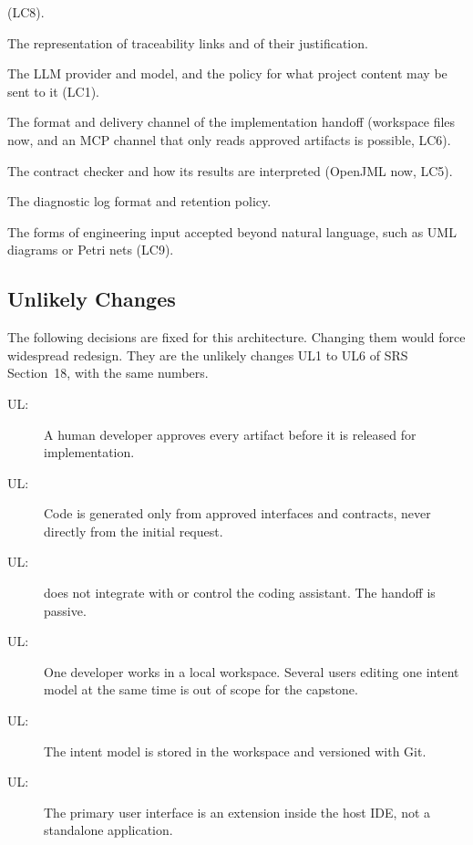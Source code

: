 \documentclass[12pt, titlepage]{article}
\newcounter{acnum}
\newcommand{\actheacnum}{AC\theacnum}
\newcounter{ucnum}
\newcommand{\uctheucnum}{UL\theucnum}
\begin{document}
\begin{description}
  (LC8).
\item[\refstepcounter{acnum} \actheacnum \label{acTrace}:] The representation
  of traceability links and of their justification.
\item[\refstepcounter{acnum} \actheacnum \label{acLLM}:] The LLM provider and
  model, and the policy for what project content may be sent to it (LC1).
\item[\refstepcounter{acnum} \actheacnum \label{acHandoff}:] The format and
  delivery channel of the implementation handoff (workspace files now, and an
  MCP channel that only reads approved artifacts is possible, LC6).
\item[\refstepcounter{acnum} \actheacnum \label{acVerifier}:] The contract
  checker and how its results are interpreted (OpenJML now, LC5).
\item[\refstepcounter{acnum} \actheacnum \label{acLogging}:] The diagnostic log
  format and retention policy.
\item[\refstepcounter{acnum} \actheacnum \label{acInputForms}:] The forms of
  engineering input accepted beyond natural language, such as UML diagrams or
  Petri nets (LC9).
\end{description}

\subsection{Unlikely Changes} \label{SecUchange}

The following decisions are fixed for this architecture. Changing them would
force widespread redesign. They are the unlikely changes UL1 to UL6 of SRS
Section~18, with the same numbers.

\begin{description}
\item[ \uctheucnum \label{ucHumanGate}:] A human developer
  approves every artifact before it is released for implementation.
\item[ \uctheucnum \label{ucContractsFirst}:] Code is
  generated only from approved interfaces and contracts, never directly from
  the initial request.
\item[ \uctheucnum \label{ucNoAssistant}:] \progname{}
  does not integrate with or control the coding assistant. The handoff is
  passive.
\item[ \uctheucnum \label{ucLocalWorkspace}:] One
  developer works in a local workspace. Several users editing one intent model
  at the same time is out of scope for the capstone.
\item[ \uctheucnum \label{ucGitVersioning}:] The intent
  model is stored in the workspace and versioned with Git.
\item[ \uctheucnum \label{ucExtensionForm}:] The primary
  user interface is an extension inside the host IDE, not a standalone
  application.
\end{description}
\end{document}
